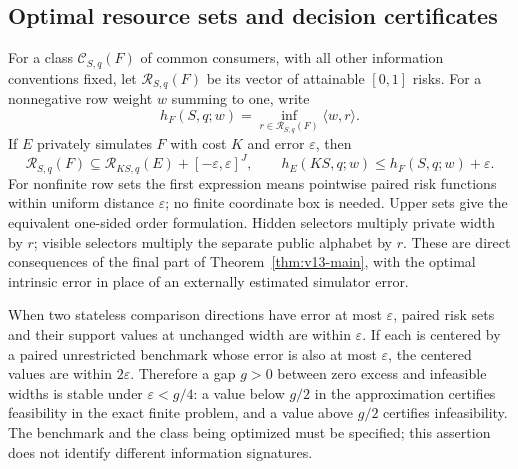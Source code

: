 \subsection{Optimal resource sets and decision certificates}
For a class $\mathcal C_{S,q}(F)$ of common consumers, with all other
information conventions fixed, let $\mathcal R_{S,q}(F)$ be its vector
of attainable $[0,1]$ risks. For a nonnegative row weight $w$ summing
to one, write
\[
 h_F(S,q;w)=\inf_{r\in\mathcal R_{S,q}(F)}\langle w,r\rangle.
\]
If $E$ privately simulates $F$ with cost $K$ and error $\varepsilon$,
then
\begin{equation}\label{eq:v13-risktransport}
 \mathcal R_{S,q}(F)\subseteq
 \mathcal R_{KS,q}(E)+[-\varepsilon,\varepsilon]^J,
 \qquad
 h_E(KS,q;w)\le h_F(S,q;w)+\varepsilon.
\end{equation}
For nonfinite row sets the first expression means pointwise paired
risk functions within uniform distance $\varepsilon$; no finite
coordinate box is needed. Upper sets give the equivalent one-sided
order formulation. Hidden selectors multiply private width by $r$;
visible selectors multiply the separate public alphabet by $r$.
These are direct consequences of the final part of
Theorem~\ref{thm:v13-main}, with the optimal intrinsic error in place
of an externally estimated simulator error.

When two stateless comparison directions have error at most
$\varepsilon$, paired risk sets and their support values at unchanged
width are within $\varepsilon$. If each is centered by a paired
unrestricted benchmark whose error is also at most $\varepsilon$, the
centered values are within $2\varepsilon$. Therefore a gap $g>0$
between zero excess and infeasible widths is stable under
$\varepsilon<g/4$: a value below $g/2$ in the approximation certifies
feasibility in the exact finite problem, and a value above $g/2$
certifies infeasibility. The benchmark and the class being optimized
must be specified; this assertion does not identify different
information signatures.

